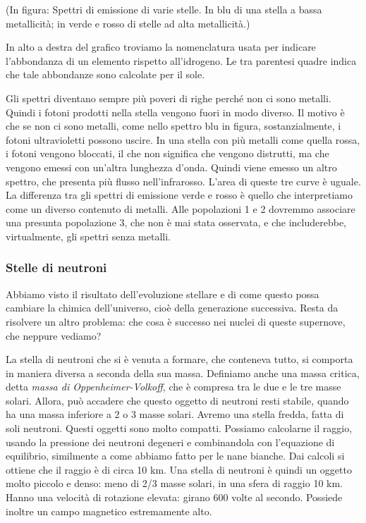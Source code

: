 (In figura: Spettri di emissione di varie stelle. In blu di una stella a bassa metallicità; in verde e rosso di stelle ad alta metallicità.)

In alto a destra del grafico troviamo la nomenclatura usata per indicare l'abbondanza di un elemento rispetto all'idrogeno. Le tra parentesi quadre indica che tale abbondanze sono calcolate per il sole.

Gli spettri diventano sempre più poveri di righe perché non ci sono metalli. Quindi i fotoni prodotti nella stella vengono fuori in modo diverso. Il motivo è che se non ci sono metalli, come nello spettro blu in figura, sostanzialmente, i fotoni ultravioletti possono uscire. In una stella con più metalli come quella rossa, i fotoni vengono bloccati, il che non significa che vengono distrutti, ma che vengono emessi con un'altra lunghezza d'onda. Quindi viene emesso un altro spettro, che presenta più flusso nell'infrarosso. L'area di queste tre curve è uguale. La differenza tra gli spettri di emissione verde e rosso è quello che interpretiamo come un diverso contenuto di metalli. Alle popolazioni 1 e 2 dovremmo associare una presunta popolazione 3, che non è mai stata osservata, e che includerebbe, virtualmente, gli spettri senza metalli.

\subsubsection{Stelle di neutroni}
Abbiamo visto il risultato dell'evoluzione stellare e di come questo possa cambiare la chimica dell'universo, cioè della generazione successiva. Resta da risolvere un altro problema: che cosa è successo nei nuclei di queste supernove, che neppure vediamo?

La stella di neutroni che si è venuta a formare, che conteneva tutto, si comporta in maniera diversa a seconda della sua massa. Definiamo anche una massa critica, detta \textit{massa di Oppenheimer-Volkoff}, che è compresa tra le due e le tre masse solari. Allora, può accadere che questo oggetto di neutroni resti stabile, quando ha una massa inferiore a 2 o 3 masse solari. Avremo una stella fredda, fatta di soli neutroni. Questi oggetti sono molto compatti. Possiamo calcolarne il raggio, usando la pressione dei neutroni degeneri e combinandola con l'equazione di equilibrio, similmente a come abbiamo fatto per le nane bianche. Dai calcoli si ottiene che il raggio è di circa 10 km. Una stella di neutroni è quindi un oggetto molto piccolo e denso: meno di 2/3 masse solari, in una sfera di raggio 10 km. Hanno una velocità di rotazione elevata: girano 600 volte al secondo. Possiede inoltre un campo magnetico estremamente alto.

